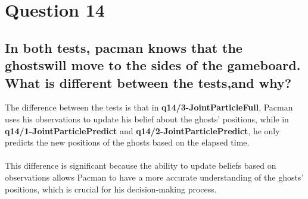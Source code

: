 \documentclass[11pt]{article}
\begin{document}
\section*{Question 14}
\subsection*{In both tests, pacman knows that the ghostswill move to the sides of the gameboard. What is different between the tests,and why?}

    The difference between the tests is that in \textbf{q14/3-JointParticleFull},
    Pacman uses his observations to update his belief about the ghosts' positions, while in \textbf{q14/1-JointParticlePredict}
    and \textbf{q14/2-JointParticlePredict}, he only predicts the new positions of the ghosts based on the elapsed time.\\\\
    This difference is significant because the ability to update beliefs based on observations allows Pacman to have a
    more accurate understanding of the ghosts' positions, which is crucial for his decision-making process.
\end{document}
